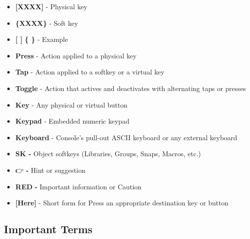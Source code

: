 \documentclass[
]{article}
\begin{document}
\begin{itemize}
\item
  \textbf{{[}XXXX{]}} - Physical key
\item
  \textbf{\{XXXX\}} - Soft key
\item
  \textbf{{[} {]}} \textbf{\{ \}} - Example
\item
  \textbf{Press} - Action applied to a physical key
\item
  \textbf{Tap} - Action applied to a softkey or a virtual key
\item
  \textbf{Toggle} - Action that actives and deactivates with alternating taps or presses
\item
  \textbf{Key} - Any physical or virtual button
\item
  \textbf{Keypad} - Embedded numeric keypad
\item
  \textbf{Keyboard} - Console's pull-out ASCII keyboard or any external keyboard
\item
  \textbf{SK -} Object softkeys (Libraries, Groups, Snaps, Macros, etc.)
\item
  👉 \textbf{-} Hint or suggestion
\item
  {\textbf{RED}} \textbf{-} Important information or Caution
\item
  \textbf{{[}Here{]}} - Short form for Press an appropriate destination key or button
\end{itemize}

\hypertarget{Important-Terms-1.3}{%
\subsection{Important Terms}\label{Important-Terms-1.3}}
\end{document}
